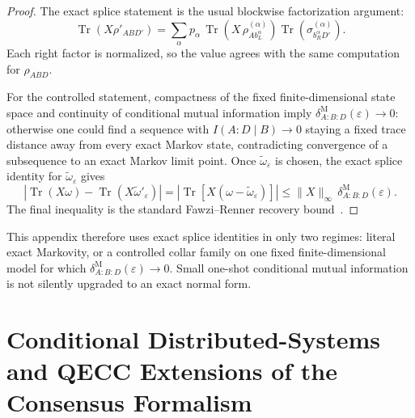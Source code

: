 \documentclass[11pt]{article}
\theoremstyle{remark}
\theoremstyle{plain}
\begin{document}
\begin{proof}
The exact splice statement is the usual blockwise factorization argument:
\[
\operatorname{Tr}(X\rho'_{AB D'})
=
\sum_\alpha
p_\alpha\,
\operatorname{Tr}\!\left(
X\, \rho^{(\alpha)}_{A b_L^\alpha}
\right)
\operatorname{Tr}\!\left(\sigma_{b_R^\alpha D'}^{(\alpha)}\right).
\]
Each right factor is normalized, so the value agrees with the same computation for \(\rho_{ABD}\).

For the controlled statement, compactness of the fixed finite-dimensional state space and continuity of conditional mutual information imply \(\delta^{\mathrm M}_{A:B:D}(\varepsilon)\to0\): otherwise one could find a sequence with \(I(A:D\mid B)\to0\) staying a fixed trace distance away from every exact Markov state, contradicting convergence of a subsequence to an exact Markov limit point. Once \(\widetilde\omega_\varepsilon\) is chosen, the exact splice identity for \(\widetilde\omega_\varepsilon\) gives
\[
\left|
\operatorname{Tr}(X\omega)-\operatorname{Tr}(X\widetilde\omega'_\varepsilon)
\right|
=
\left|
\operatorname{Tr}\!\left[X(\omega-\widetilde\omega_\varepsilon)\right]
\right|
\le
\|X\|_\infty\,
\delta^{\mathrm M}_{A:B:D}(\varepsilon).
\]
The final inequality is the standard Fawzi--Renner recovery bound~\cite{fawziRenner15}.
\end{proof}

This appendix therefore uses exact splice identities in only two regimes: literal exact Markovity, or a controlled collar family on one fixed finite-dimensional model for which \(\delta^{\mathrm M}_{A:B:D}(\varepsilon)\to0\). Small one-shot conditional mutual information is not silently upgraded to an exact normal form.



\section{Conditional Distributed-Systems and QECC Extensions of the Consensus Formalism}\label{app:bft-qecc}

\end{document}
